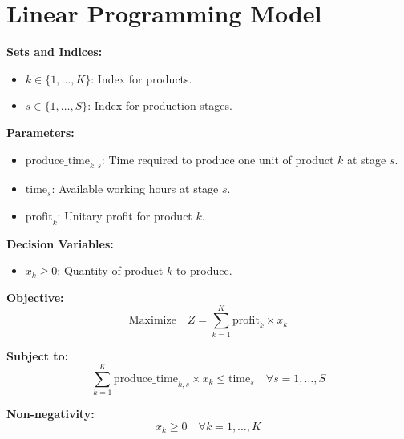\documentclass{article}
\begin{document}
\section*{Linear Programming Model}

\textbf{Sets and Indices:}
\begin{itemize}
    \item \( k \in \{1, \ldots, K\} \): Index for products.
    \item \( s \in \{1, \ldots, S\} \): Index for production stages.
\end{itemize}

\textbf{Parameters:}
\begin{itemize}
    \item \(\text{produce\_time}_{k, s}\): Time required to produce one unit of product \( k \) at stage \( s \).
    \item \(\text{time}_{s}\): Available working hours at stage \( s \).
    \item \(\text{profit}_{k}\): Unitary profit for product \( k \).
\end{itemize}

\textbf{Decision Variables:}
\begin{itemize}
    \item \( x_k \geq 0 \): Quantity of product \( k \) to produce.
\end{itemize}

\textbf{Objective:}
\[
\text{Maximize} \quad Z = \sum_{k=1}^{K} \text{profit}_k \times x_k
\]

\textbf{Subject to:}
\[
\sum_{k=1}^{K} \text{produce\_time}_{k, s} \times x_k \leq \text{time}_s \quad \forall s = 1, \ldots, S
\]

\textbf{Non-negativity:}
\[
x_k \geq 0 \quad \forall k = 1, \ldots, K
\]
\end{document}

